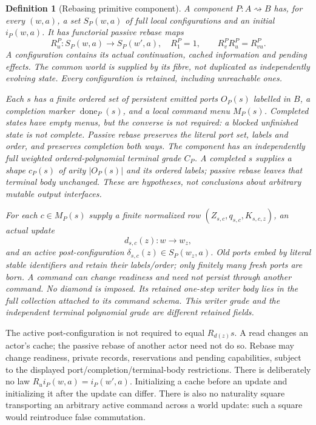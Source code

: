 \documentclass[11pt]{article}
\newtheorem{definition}{Definition}\newtheorem{theorem}[definition]{Theorem}\newtheorem{proposition}[definition]{Proposition}
\begin{document}
\begin{definition}[Rebasing primitive component]
A component $P:A\rightsquigarrow B$ has, for every $(w,a)$, a set $S_P(w,a)$ of full local configurations and an initial $i_P(w,a)$. It has functorial passive rebase maps
\[
 R^P_u:S_P(w,a)\to S_P(w',a),\quad
 R^P_1=1,\qquad R^P_vR^P_u=R^P_{vu}.                 \tag{R}
\]
A configuration contains its actual continuation, cached information and pending effects. The common world is supplied by its fibre, not duplicated as independently evolving state. Every configuration is retained, including unreachable ones.

Each $s$ has a finite ordered set of persistent emitted ports $O_P(s)$ labelled in $B$, a completion marker $\operatorname{done}_P(s)$, and a local command menu $M_P(s)$. Completed states have empty menus, but the converse is not required: a blocked unfinished state is not complete. Passive rebase preserves the literal port set, labels and order, and preserves completion both ways. The component has an independently full weighted ordered-polynomial terminal grade $C_P$. A completed $s$ supplies a shape $c_P(s)$ of arity $|O_P(s)|$ and its ordered labels; passive rebase leaves that terminal body unchanged. These are hypotheses, not conclusions about arbitrary mutable output interfaces.

For each $c\in M_P(s)$ supply a finite normalized row $(Z_{s,c},q_{s,c},K_{s,c,z})$, an actual update
\[
 d_{s,c}(z):w\to w_z,
\]
and an active post-configuration $\delta_{s,c}(z)\in S_P(w_z,a)$. Old ports embed by literal stable identifiers and retain their labels/order; only finitely many fresh ports are born. A command can change readiness and need not persist through another command. No diamond is imposed. Its retained one-step writer body lies in the full collection attached to its command schema. This writer grade and the independent terminal polynomial grade are different retained fields.
\end{definition}
The active post-configuration is not required to equal $R_{d(z)}s$. A read changes an actor's cache; the passive rebase of another actor need not do so. Rebase may change readiness, private records, reservations and pending capabilities, subject to the displayed port/completion/terminal-body restrictions. There is deliberately no law $R_ui_P(w,a)=i_P(w',a)$. Initializing a cache before an update and initializing it after the update can differ. There is also no naturality square transporting an arbitrary active command across a world update: such a square would reintroduce false commutation.
\end{document}
